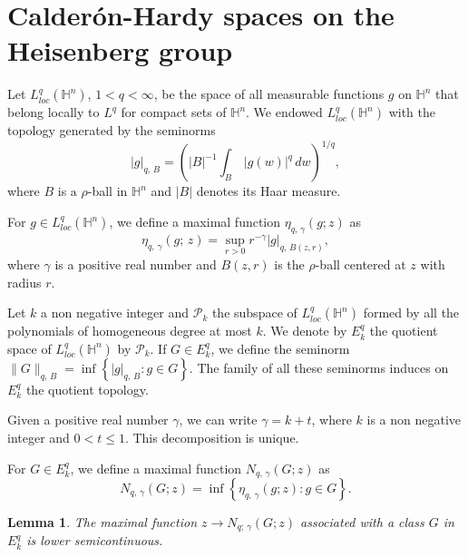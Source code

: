 \documentclass[reqno,10pt]{article}
\newtheorem{lemma}[theorem]{Lemma}
\theoremstyle{definition}
\numberwithin{equation}{section}
\numberwithin{theorem}{section}
\begin{document}
\section{Calder\'on-Hardy spaces on the Heisenberg group}

Let $L^{q}_{loc}(\mathbb{H}^{n})$, $1 < q < \infty$, be the space of all measurable functions $g$ on $\mathbb{H}^{n}$ that belong locally to 
$L^{q}$ for compact sets of $\mathbb{H}^{n}$. We endowed $L^{q}_{loc}(\mathbb{H}^{n})$ with the topology generated by the seminorms
\[
|g|_{q, \, B} = \left( |B|^{-1} \int_{B} \, |g(w)|^{q}\, dw \right)^{1/q},
\] 
where $B$ is a $\rho$-ball in $\mathbb{H}^{n}$ and $|B|$ denotes its Haar measure.

For $g \in L^{q}_{loc}(\mathbb{H}^{n})$, we define a maximal function $\eta_{q, \, \gamma}(g; z)$ as
\[
\eta_{q, \, \gamma}(g; \, z) = \sup_{r > 0} r^{-\gamma} |g|_{q, \, B(z, r)},
\]
where $\gamma$ is a positive real number and $B(z, r)$ is the $\rho$-ball centered at $z$ with radius $r$.

Let $k$ a non negative integer and $\mathcal{P}_{k}$ the subspace of $L^{q}_{loc}(\mathbb{H}^{n})$ formed by all the polynomials of homogeneous degree at most $k$. We denote by $E^{q}_{k}$ the quotient space of $L^{q}_{loc}(\mathbb{H}^{n})$ by $\mathcal{P}_{k}$. If 
$G \in E^{q}_{k}$, we define the seminorm $\| G \|_{q, \, B} = \inf \left\{ |g|_{q, \, B} : g \in G \right\}$. The family of all these seminorms induces on $E^{q}_{k}$ the quotient topology.

Given a positive real number $\gamma$, we can write $\gamma = k + t$, where $k$ is a non negative integer and $0 < t \leq 1$. This decomposition is unique.

For $G \in E^{q}_{k}$, we define a maximal function $N_{q, \, \gamma}(G; z)$ as 
\[
N_{q, \, \gamma}(G; z) = \inf \left\{ \eta_{q, \, \gamma}(g; z) : g \in G \right\}.
\]

\begin{lemma} The maximal function $z \to N_{q; \, \gamma}(G; z)$ associated with a class $G$ in 
$E_{k}^{q}$ is lower semicontinuous.
\end{lemma}
\end{document}

